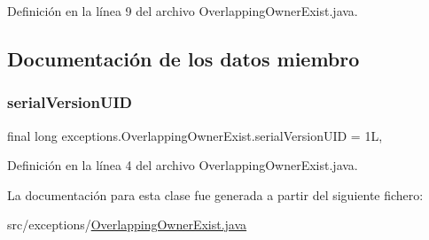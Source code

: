 Definición en la línea 9 del archivo Overlapping\+Owner\+Exist.\+java.


\begin{DoxyCode}{0}

\end{DoxyCode}


\subsection{Documentación de los datos miembro}
\mbox{\label{classexceptions_1_1_overlapping_owner_exist_a6b81e5ae08ae481fc4ca932285ecdac7}} 
\subsubsection{\texorpdfstring{serialVersionUID}{serialVersionUID}}
{\footnotesize\ttfamily final long exceptions.\+Overlapping\+Owner\+Exist.\+serial\+Version\+U\+ID = 1L\hspace{0.3cm}{\ttfamily [static]}, {\ttfamily [private]}}



Definición en la línea 4 del archivo Overlapping\+Owner\+Exist.\+java.



La documentación para esta clase fue generada a partir del siguiente fichero\+:\begin{DoxyCompactItemize}
\item 
src/exceptions/\mbox{\hyperlink{_overlapping_owner_exist_8java}{Overlapping\+Owner\+Exist.\+java}}\end{DoxyCompactItemize}
